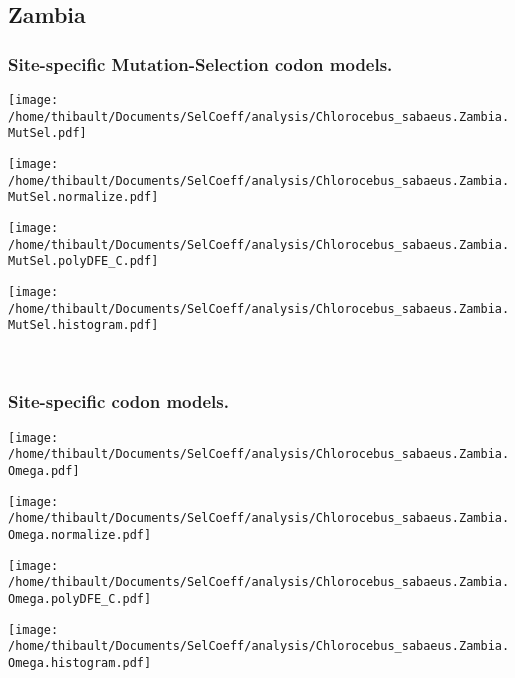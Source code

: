\subsection{Zambia} 
 
\subsubsection*{Site-specific Mutation-Selection codon models.} 
\begin{minipage}{0.49\linewidth} 
\texttt{[image: /home/thibault/Documents/SelCoeff/analysis/Chlorocebus\_sabaeus.Zambia.MutSel.pdf]} 
\end{minipage}
\begin{minipage}{0.49\linewidth} 
\texttt{[image: /home/thibault/Documents/SelCoeff/analysis/Chlorocebus\_sabaeus.Zambia.MutSel.normalize.pdf]} 
\end{minipage}
\begin{minipage}{0.49\linewidth} 
\texttt{[image: /home/thibault/Documents/SelCoeff/analysis/Chlorocebus\_sabaeus.Zambia.MutSel.polyDFE\_C.pdf]} 
\end{minipage}
\begin{minipage}{0.49\linewidth} 
\texttt{[image: /home/thibault/Documents/SelCoeff/analysis/Chlorocebus\_sabaeus.Zambia.MutSel.histogram.pdf]} 
\end{minipage}
\\ 
\subsubsection*{Site-specific codon models.} 
\begin{minipage}{0.49\linewidth} 
\texttt{[image: /home/thibault/Documents/SelCoeff/analysis/Chlorocebus\_sabaeus.Zambia.Omega.pdf]} 
\end{minipage}
\begin{minipage}{0.49\linewidth} 
\texttt{[image: /home/thibault/Documents/SelCoeff/analysis/Chlorocebus\_sabaeus.Zambia.Omega.normalize.pdf]} 
\end{minipage}
\begin{minipage}{0.49\linewidth} 
\texttt{[image: /home/thibault/Documents/SelCoeff/analysis/Chlorocebus\_sabaeus.Zambia.Omega.polyDFE\_C.pdf]} 
\end{minipage}
\begin{minipage}{0.49\linewidth} 
\texttt{[image: /home/thibault/Documents/SelCoeff/analysis/Chlorocebus\_sabaeus.Zambia.Omega.histogram.pdf]} 
\end{minipage}
\\ 
